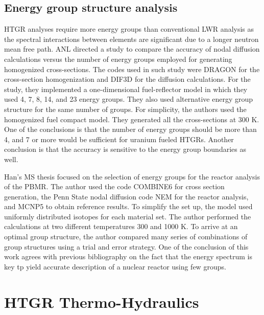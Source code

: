 \documentclass[11pt,letterpaper]{article}
\begin{document}
\subsection{Energy group structure analysis}

\gls{HTGR} analyses require more energy groups than conventional \gls{LWR} analysis as the spectral interactions between elements are significant due to a longer neutron mean free path.
\gls{ANL} directed a study \cite{lee_status_2006} to compare the accuracy of nodal diffusion calculations versus the number of energy groups employed for generating homogenized cross-sections.
The codes used in such study were DRAGON for the cross-section homogenization and DIF3D for the diffusion calculations.
For the study, they implemented a one-dimensional fuel-reflector model in which they used 4, 7, 8, 14, and 23 energy groups.
They also used alternative energy group structure for the same number of groups.
For simplicity, the authors used the homogenized fuel compact model.
They generated all the cross-sections at 300 K.
One of the conclusions is that the number of energy groups should be more than 4, and 7 or more would be sufficient for uranium fueled \glspl{HTGR}.
Another conclusion is that the accuracy is sensitive to the energy group boundaries as well.

Han's MS thesis \cite{han_sensitivity_2008} focused on the selection of energy groups for the reactor analysis of the \gls{PBMR}.
The author used the code COMBINE6 \cite{grimesey_combinepc-portable_1994} for cross section generation, the Penn State nodal diffusion code NEM \cite{bandini_three-dimensional_1990} for the reactor analysis, and MCNP5 to obtain reference results.
To simplify the set up, the model used uniformly distributed isotopes for each material set.
The author performed the calculations at two different temperatures 300 and 1000 K.
To arrive at an optimal group structure, the author compared many series of combinations of group structures using a trial and error strategy.
One of the conclusion of this work agrees with previous bibliography \cite{gulf_oil_company_nuclear_1973} \cite{duderstadt_nuclear_1976} on the fact that the energy spectrum is key tp yield accurate description of a nuclear reactor using few groups.




\section{HTGR Thermo-Hydraulics}
\end{document}
